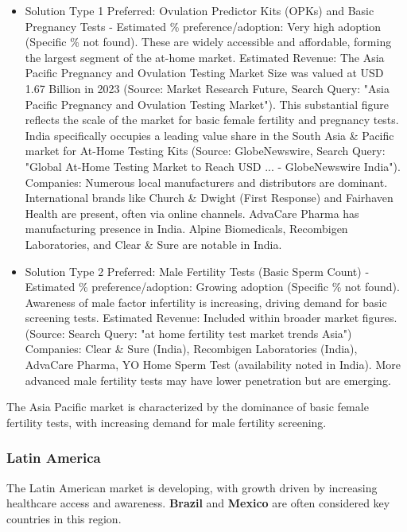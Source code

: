 \documentclass{article}
\begin{document}
\begin{itemize}
  \item Solution Type 1 Preferred: Ovulation Predictor Kits (OPKs) and Basic Pregnancy Tests - Estimated \% preference/adoption: Very high adoption (Specific \% not found). These are widely accessible and affordable, forming the largest segment of the at-home market.
    Estimated Revenue: The Asia Pacific Pregnancy and Ovulation Testing Market Size was valued at USD 1.67 Billion in 2023 (Source: Market Research Future, Search Query: "Asia Pacific Pregnancy and Ovulation Testing Market"). This substantial figure reflects the scale of the market for basic female fertility and pregnancy tests. India specifically occupies a leading value share in the South Asia & Pacific market for At-Home Testing Kits (Source: GlobeNewswire, Search Query: "Global At-Home Testing Market to Reach USD ... - GlobeNewswire India").
    Companies: Numerous local manufacturers and distributors are dominant. International brands like Church \& Dwight (First Response) and Fairhaven Health are present, often via online channels. AdvaCare Pharma has manufacturing presence in India. Alpine Biomedicals, Recombigen Laboratories, and Clear \& Sure are notable in India.
  \item Solution Type 2 Preferred: Male Fertility Tests (Basic Sperm Count) - Estimated \% preference/adoption: Growing adoption (Specific \% not found). Awareness of male factor infertility is increasing, driving demand for basic screening tests.
    Estimated Revenue: Included within broader market figures. (Source: Search Query: "at home fertility test market trends Asia")
    Companies: Clear \& Sure (India), Recombigen Laboratories (India), AdvaCare Pharma, YO Home Sperm Test (availability noted in India). More advanced male fertility tests may have lower penetration but are emerging.
\end{itemize}
The Asia Pacific market is characterized by the dominance of basic female fertility tests, with increasing demand for male fertility screening.

\subsubsection{Latin America}
The Latin American market is developing, with growth driven by increasing healthcare access and awareness. \textbf{Brazil} and \textbf{Mexico} are often considered key countries in this region.
\end{document}
